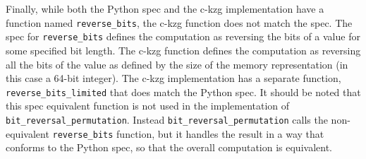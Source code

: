 \documentclass[12pt]{galois-whitepaper}
\begin{document}
Finally, while both the Python spec and the c-kzg implementation have a function named \texttt{reverse\_bits}, the c-kzg function does not 
match the spec. The spec for \texttt{reverse\_bits} defines the computation as reversing the bits of a value for some specified bit length. The c-kzg 
function defines the computation as reversing all the bits of the value as defined by the size of the memory representation (in this case a 64-bit integer). The 
c-kzg implementation has a separate function, \texttt{reverse\_bits\_limited} that does match the Python spec. It should be noted that this spec 
equivalent function is not used in the implementation of \texttt{bit\_reversal\_permutation}. Instead \texttt{bit\_reversal\_permutation} calls the 
non-equivalent \texttt{reverse\_bits} function, but it handles the result in a way that conforms to the Python spec, so that the overall computation 
is equivalent.
\end{document}
